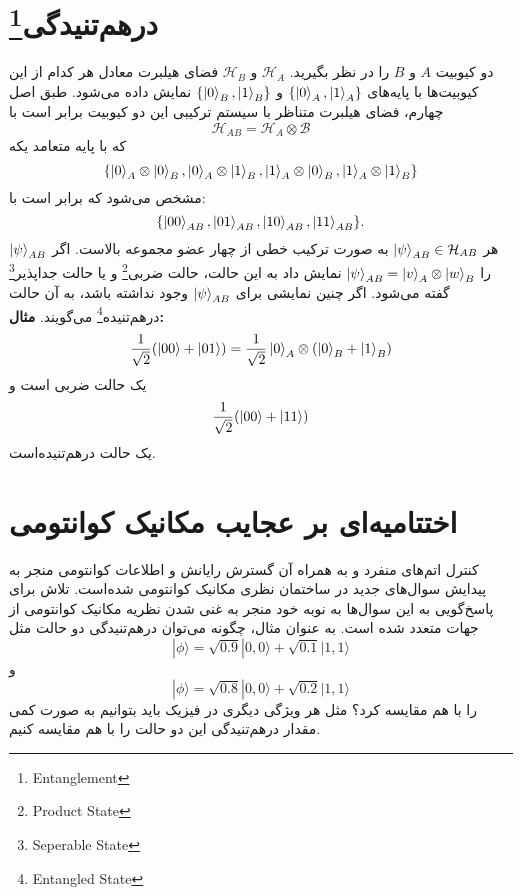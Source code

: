 \section{درهم‌تنیدگی\footnote{Entanglement}}
دو کیوبیت  $A$ و $B$ را در نظر بگیرید. $\mathcal{H}_{A}$ و $\mathcal{H}_{B}$ فضای هیلبرت معادل هر کدام از این کیوبیت‌ها با پایه‌های $\{ \ket{0}_{A}, \ket{1}_{A}\}$ و $\{ \ket{0}_{B}, \ket{1}_{B}\}$ نمایش داده می‌شود. طبق اصل چهارم، فضای هیلبرت متناظر با سیستم ترکیبی این دو کیوبیت برابر است با 
 \begin{equation}
 	\mathcal{H}_{AB} = \mathcal{H}_{A} \otimes \mathcal{B}
 \end{equation}
 که با پایه متعامد یکه 
 \begin{equation}
 	\{ \ket{0}_{A} \otimes \ket{0}_{B}, \ket{0}_{A} \otimes \ket{1}_{B}, \ket{1}_{A} \otimes \ket{0}_{B},\ket{1}_{A} \otimes \ket{1}_{B}\}
 \end{equation}
  مشخص می‌شود که برابر است با:
    \begin{equation}
 	\{ \ket{00}_{AB}, \ket{01}_{AB}, \ket{10}_{AB},\ket{11}_{AB}\}.
 \end{equation}
 هر $\ket{\psi}_{AB} \in \mathcal{H}_{AB}$ به صورت ترکیب خطی از چهار عضو مجموعه بالاست. اگر $\ket{\psi}_{AB}$ را $\ket{\psi}_{AB} = \ket{v}_{A} \otimes \ket{w}_{B}$ نمایش داد به این حالت، حالت ضربی\footnote{Product State } و یا حالت جداپذیر\footnote{Seperable State} گفته می‌شود. اگر چنین نمایشی برای $\ket{\psi}_{AB}$ وجود نداشته باشد، به آن حالت درهم‌تنیده\footnote{Entangled State} می‌گویند. 
 \textbf{مثال: }
 \begin{equation}
 	\frac{1}{\sqrt{2}}(\ket{00} + \ket{01}) = \frac{1}{\sqrt{2}} \ket{0}_{A} \otimes (\ket{0}_{B} + \ket{1}_{B})
 \end{equation}
 یک حالت ضربی است و 
 \begin{equation}
 	\frac{1}{\sqrt{2}}(\ket{00} + \ket{11})
 \end{equation}
  یک حالت درهم‌تنیده‌است. 
  \section{اختتامیه‌ای بر عجایب مکانیک کوانتومی}
 کنترل اتم‌های منفرد و به همراه آن گسترش رایانش و اطلاعات کوانتومی منجر به پیدایش سوال‌های جدید در ساختمان نظری مکانیک کوانتومی
شده‌است. تلاش برای پاسخ‌گویی به این سوال‌ها به نوبه خود منجر به غنی شدن نظریه مکانیک کوانتومی از جهات متعدد شده است. به عنوان مثال،
چگونه می‌توان درهم‌تنیدگی دو حالت مثل 
\begin{equation}
	| \phi \rangle = \sqrt{0.9}|0,0\rangle + \sqrt{0.1}|1,1\rangle
\end{equation}
و 
\begin{equation}
	| \phi \rangle = \sqrt{0.8}|0,0\rangle + \sqrt{0.2}|1,1\rangle
\end{equation}
را با هم مقایسه کرد؟
مثل هر ویژگی دیگری در فیزیک باید بتوانیم به صورت کمی مقدار درهم‌تنیدگی این دو حالت را با هم مقایسه کنیم.

